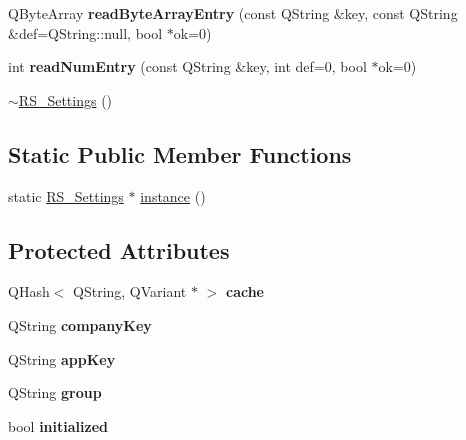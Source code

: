 \begin{DoxyCompactItemize}
\item 
\hypertarget{classRS__Settings_a94112549cf62631dc0c76857117d6d72}{Q\-Byte\-Array {\bfseries read\-Byte\-Array\-Entry} (const Q\-String \&key, const Q\-String \&def=Q\-String\-::null, bool $\ast$ok=0)}\label{classRS__Settings_a94112549cf62631dc0c76857117d6d72}

\item 
\hypertarget{classRS__Settings_a149e7a47a4950c097e301efadaefa1bf}{int {\bfseries read\-Num\-Entry} (const Q\-String \&key, int def=0, bool $\ast$ok=0)}\label{classRS__Settings_a149e7a47a4950c097e301efadaefa1bf}

\item 
\hyperlink{classRS__Settings_a11cd6bd58e182e5685c8739e1f41a6e9}{$\sim$\-R\-S\-\_\-\-Settings} ()
\end{DoxyCompactItemize}
\subsection*{Static Public Member Functions}
\begin{DoxyCompactItemize}
\item 
static \hyperlink{classRS__Settings}{R\-S\-\_\-\-Settings} $\ast$ \hyperlink{classRS__Settings_a33152d43aa57de0e981f4eac75c74a0c}{instance} ()
\end{DoxyCompactItemize}
\subsection*{Protected Attributes}
\begin{DoxyCompactItemize}
\item 
\hypertarget{classRS__Settings_ae5f85d30330e26c7bfe3b29e6629bf1c}{Q\-Hash$<$ Q\-String, Q\-Variant $\ast$ $>$ {\bfseries cache}}\label{classRS__Settings_ae5f85d30330e26c7bfe3b29e6629bf1c}

\item 
\hypertarget{classRS__Settings_ac2592ba4227e364c3334a34de2f20419}{Q\-String {\bfseries company\-Key}}\label{classRS__Settings_ac2592ba4227e364c3334a34de2f20419}

\item 
\hypertarget{classRS__Settings_a05d5015e404c8438e3eaaa55adeaf470}{Q\-String {\bfseries app\-Key}}\label{classRS__Settings_a05d5015e404c8438e3eaaa55adeaf470}

\item 
\hypertarget{classRS__Settings_a4f88763bb8a72acad954077164c23fb2}{Q\-String {\bfseries group}}\label{classRS__Settings_a4f88763bb8a72acad954077164c23fb2}

\item 
\hypertarget{classRS__Settings_acc05a9689ed044ee5adefcddd18f2476}{bool {\bfseries initialized}}\label{classRS__Settings_acc05a9689ed044ee5adefcddd18f2476}

\end{DoxyCompactItemize}
